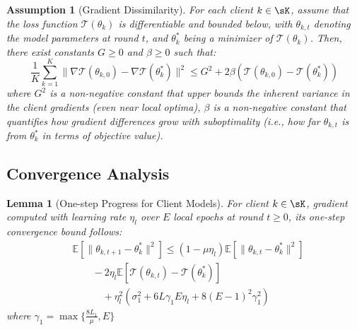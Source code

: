 \documentclass[lettersize,journal]{IEEEtran}
\newtheorem{assumption}{Assumption}
\newtheorem{lemma}{Lemma}
\begin{document}
\begin{assumption}[Gradient Dissimilarity]
\label{asm:5}
For each client \( k \in \sK \), assume that the loss function \( \mathcal{T}(\theta_k) \) is differentiable and bounded below, with \( \theta_{k,t} \) denoting the model parameters at round \( t \), and \( \theta_k^* \) being a minimizer of \( \mathcal{T}(\theta_k) \). Then, there exist constants \( G \geq 0 \) and \( \beta \geq 0 \) such that:
\begin{equation}
\frac{1}{K}\sum_{k=1}^K \|\nabla \mathcal{T}(\theta_{k,0}) - \nabla \mathcal{T}(\theta_k^*)\|^2 
\leq G^2 + 2\beta \left( \mathcal{T}(\theta_{k,0}) - \mathcal{T}(\theta_k^*) \right)
\end{equation}
where \( G^2 \) is a non-negative constant that upper bounds the inherent variance in the client gradients (even near local optima), \( \beta \) is a non-negative constant that quantifies how gradient differences grow with suboptimality (i.e., how far \( \theta_{k,t} \) is from \( \theta_k^* \) in terms of objective value).

\end{assumption}


\subsection{Convergence Analysis}
\begin{lemma}[One-step Progress for Client Models]
\label{lemma:1}
For client $k \in \sK$, gradient computed with learning rate $\eta_l$ over $E$ local epochs at round $t \geq 0$, its one-step convergence bound follows:
\begin{equation}
\begin{split}
    &\mathbb{E}[\|\theta_{k,t+1} - \theta_k^*\|^2] \leq (1-\mu\eta_l)\mathbb{E}[\|\theta_{k,t}  - \theta_k^*\|^2]\\
    & \qquad - 2\eta_l\mathbb{E}[\mathcal{T}(\theta_{k,t}) - \mathcal{T}(\theta_k^*)]\\ 
    & \qquad \quad + \eta_l^2\left(\sigma_1^2 + 6L\gamma_1 E\eta_l + 8(E-1)^2\gamma_1^2\right)
\end{split}
\end{equation}
where $\gamma_1 = \max\{\frac{8L_1}{\mu}, E\}$
\end{lemma}
\end{document}

